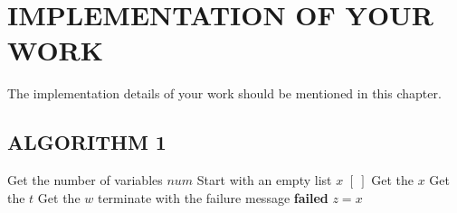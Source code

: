
\chapter{\uppercase{Implementation of your work}} %
\label{chap4} %
The implementation details of your work should be mentioned in this chapter.
\section{\uppercase{Algorithm 1}}
\begin{algorithm}
\begin{algorithmic}[1]
\State Get the number of variables $num$ 
\State Start with an empty list $x$ $[~]$
	\State Get the $x$
	\State  Get the $t$
	\State Get the $w$
\EndFor 
{} 
	\State terminate with the failure message \textbf{failed}
\Else
	\State $z = x$
\EndIf 

\end{algorithmic}
\end{algorithm}



